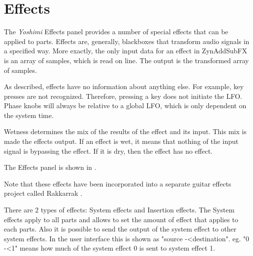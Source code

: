 %
%
%

\section{Effects}
\label{sec:effects}

   The \textsl{Yoshimi} Effects panel provides a number of special effects
   that can be applied to parts.
   Effects are, generally, blackboxes that transform audio signals in a
   specified way. More exactly, the only input data for an effect in
   ZynAddSubFX is an array of samples, which is read on line.
   The output is the transformed array of samples.

   As described, effects have no information about anything else. For
   example, key presses are not recognized. Therefore, pressing a key does
   not initiate the LFO. Phase knobs will always be relative to a global LFO,
   which is only dependent on the system time.

   Wetness determines the mix of the results of the effect and its input.
   This mix is made the effects output. If an effect is wet, it means that
   nothing of the input signal is bypassing the effect. If it is dry, then
   the effect has no effect.

   The Effects panel is shown in
   .

   Note that these effects have been incorporated into a separate
   guitar effects project called Rakkarrak \cite{rakarrack}.

   There are 2 types of effects: System effects and Insertion effects. The
   System effects apply to all parts and allows to set the amount of effect
   that applies to each parts. Also it is possible to send the output of the
   system effect to other system effects. In the user interface this is shown
   as "source -\textless destination". eg. "0 -\textless 1" means how much of
   the system effect 0 is sent to system effect 1.

